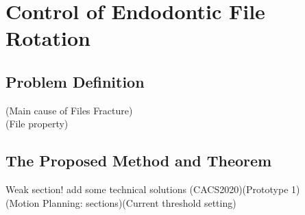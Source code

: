 \chapter{Control of Endodontic File Rotation}
\section{Problem Definition}
(Main cause of Files Fracture)					\\
(File property)
\section{The Proposed Method and Theorem}
Weak section! add some technical solutions
(CACS2020)(Prototype 1)							\\
(Motion Planning: sections)(Current threshold setting)